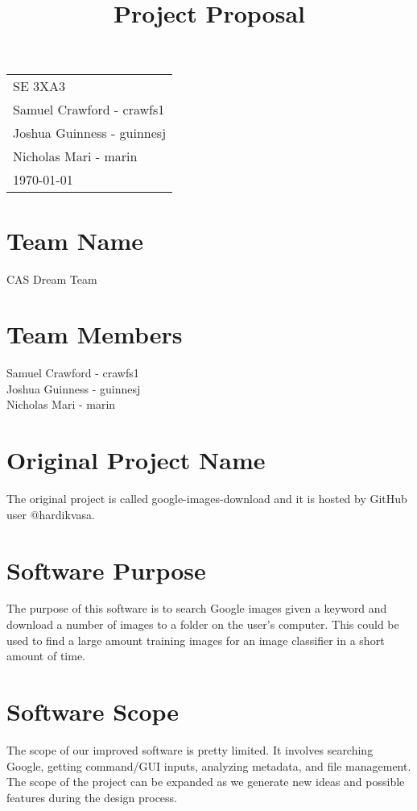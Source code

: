 \documentclass[12pt]{article}
\title{Project Proposal}
\date{}
\begin{document}
 
\noindent
\begin{tabular}[c]{@{}l@{}}
SE 3XA3\\
Samuel Crawford - crawfs1\\
Joshua Guinness - guinnesj\\
Nicholas Mari - marin\\
\today
\end{tabular}

{
\let\newpage\relax
\maketitle
}
 
\section* {Team Name}

CAS Dream Team

\section* {Team Members}

Samuel Crawford - crawfs1\\
Joshua Guinness - guinnesj\\
Nicholas Mari - marin\\

\section* {Original Project Name}

The original project is called google-images-download and it is hosted by GitHub user @hardikvasa.

\section* {Software Purpose}

The purpose of this software is to search Google images given a keyword and download a number of images to a folder on the user’s computer. This could be used to find a large amount training images for an image classifier in a short amount of time.

\section* {Software Scope}

The scope of our improved software is pretty limited. It involves searching Google, getting command/GUI inputs, analyzing metadata, and file management. The scope of the project can be expanded as we generate new ideas and possible features during the design process.
\end{document}
